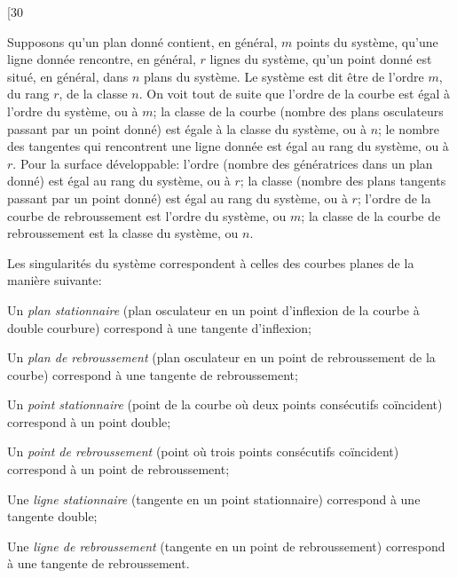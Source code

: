 \documentclass[11pt,a4paper]{book}
\begin{document}
\newpage
\setcounter{page}{208}

\begin{center}
{\small [30}
\end{center}
\vspace{-1em}

Supposons qu'un plan donn\'{e} contient, en g\'{e}n\'{e}ral, $m$ points du syst\`{e}me, qu'une ligne
donn\'{e}e rencontre, en g\'{e}n\'{e}ral, $r$ lignes du syst\`{e}me, qu'un point donn\'{e} est situ\'{e}, en
g\'{e}n\'{e}ral, dans $n$ plans du syst\`{e}me. Le syst\`{e}me est dit \^{e}tre de l'ordre $m$, du rang $r$,
de la classe $n$. On voit tout de suite que l'ordre de la courbe est \'{e}gal \`{a} l'ordre du
syst\`{e}me, ou \`{a} $m$; la classe de la courbe (nombre des plans osculateurs passant par
un point donn\'{e}) est \'{e}gale \`{a} la classe du syst\`{e}me, ou \`{a} $n$; le nombre des tangentes qui
rencontrent une ligne donn\'{e}e est \'{e}gal au rang du syst\`{e}me, ou \`{a} $r$. Pour la surface
d\'{e}veloppable: l'ordre (nombre des g\'{e}n\'{e}ratrices dans un plan donn\'{e}) est \'{e}gal au rang du
syst\`{e}me, ou \`{a} $r$; la classe (nombre des plans tangents passant par un point donn\'{e}) est
\'{e}gal au rang du syst\`{e}me, ou \`{a} $r$; l'ordre de la courbe de rebroussement est l'ordre du
syst\`{e}me, ou $m$; la classe de la courbe de rebroussement est la classe du syst\`{e}me, ou $n$.

\newpage
\setcounter{page}{209}

Les singularit\'{e}s du syst\`{e}me correspondent \`{a} celles des courbes planes de la mani\`{e}re
suivante:

Un \textit{plan stationnaire} (plan osculateur en un point d'inflexion de la courbe \`{a} double
courbure) correspond \`{a} une tangente d'inflexion;

Un \textit{plan de rebroussement} (plan osculateur en un point de rebroussement de la courbe)
correspond \`{a} une tangente de rebroussement;

Un \textit{point stationnaire} (point de la courbe o\`{u} deux points cons\'{e}cutifs co\"{i}ncident)
correspond \`{a} un point double;

Un \textit{point de rebroussement} (point o\`{u} trois points cons\'{e}cutifs co\"{i}ncident) correspond
\`{a} un point de rebroussement;

Une \textit{ligne stationnaire} (tangente en un point stationnaire) correspond \`{a} une tangente
double;

Une \textit{ligne de rebroussement} (tangente en un point de rebroussement) correspond \`{a}
une tangente de rebroussement.
\end{document}
